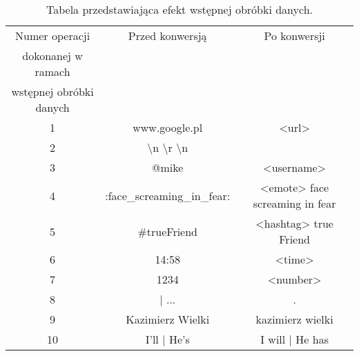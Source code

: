 \begin{table}[!h] \label{tab:tabela2} \centering
    \caption{Tabela przedstawiająca efekt wstępnej obróbki danych.}
    \begin{tabular} {| c | c | c |} \hline
        Numer operacji          & Przed konwersją                                          & Po konwersji                   \\
        dokonanej w ramach      &                                                          &                                \\
        wstępnej obróbki danych &                                                          &                                \\ \hline\hline
        1                       & www.google.pl                                            & <url>                          \\ \hline
        2                       & \textbackslash n \quad \textbackslash r \textbackslash n &                                \\ \hline
        3                       & @mike                                                    & <username>                     \\ \hline
        4                       & :face\_screaming\_in\_fear:                              & <emote> face screaming in fear \\ \hline
        5                       & \#trueFriend                                             & <hashtag> true Friend          \\ \hline
        6                       & 14:58                                                    & <time>                         \\ \hline
        7                       & 1234                                                     & <number>                       \\ \hline
        8                       & | ...                                                    & .                              \\ \hline
        9                       & Kazimierz Wielki                                         & kazimierz wielki               \\ \hline
        10                      & I'll \quad | \quad He's                                  & I will \quad | \quad He has    \\ \hline
    \end{tabular}
\end{table}

%




